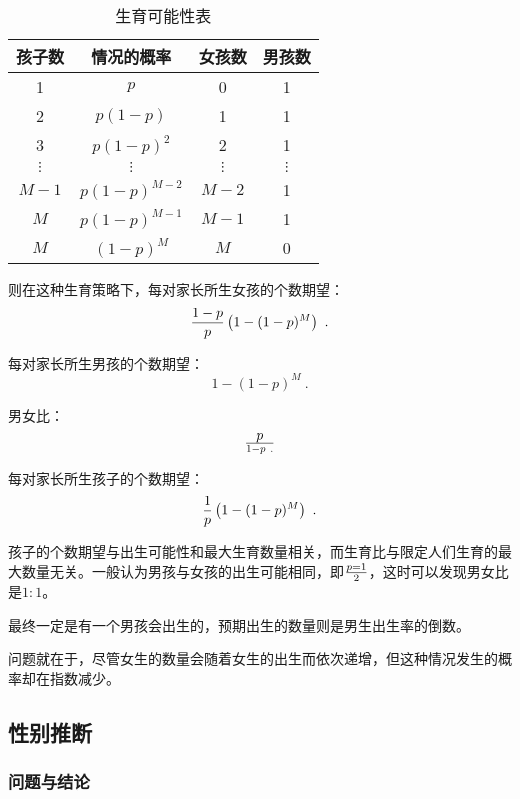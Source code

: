 \begin{table}[ht]
\centering
\caption{生育可能性表}\label{tab_CitPrb1}
\begin{tabular}{|c|c|c|c|}
\hline
孩子数 & 情况的概率 & 女孩数 & 男孩数 \\
\hline
1 & $p$ & 0 & 1 \\
\hline
2 & $p(1-p)$ & 1 & 1 \\
\hline
3 & $p(1-p)^2$ & 2 & 1 \\
\hline
$\vdots$ & $\vdots$ & $\vdots$ & $\vdots$ \\
\hline
$M-1$ & $p(1-p)^{M-2}$ & $M-2$ & 1 \\
\hline
$M$ & $p(1-p)^{M-1}$ & $M-1$ & 1 \\
\hline
$M$ & $(1-p)^M$ & $M$ & 0 \\
\hline
\end{tabular}
\end{table}
则在这种生育策略下，每对家长所生女孩的个数期望：
\begin{equation}
{1-p\over p}\left(1-(1-p)^M\right)~.
\end{equation}

每对家长所生男孩的个数期望：
\begin{equation}
1-(1-p)^M~.
\end{equation}

男女比：
\begin{equation}
p\over 1-p~.
\end{equation}

每对家长所生孩子的个数期望：
\begin{equation}
{1\over p}\left(1-(1-p)^M\right)~.
\end{equation}

孩子的个数期望与出生可能性和最大生育数量相关，而生育比与限定人们生育的最大数量无关。一般认为男孩与女孩的出生可能相同，即$p=1\over2$，这时可以发现男女比是$1:1$。

最终一定是有一个男孩会出生的，预期出生的数量则是男生出生率的倒数。

问题就在于，尽管女生的数量会随着女生的出生而依次递增，但这种情况发生的概率却在指数减少。

\subsection{性别推断}

\subsubsection{问题与结论}

